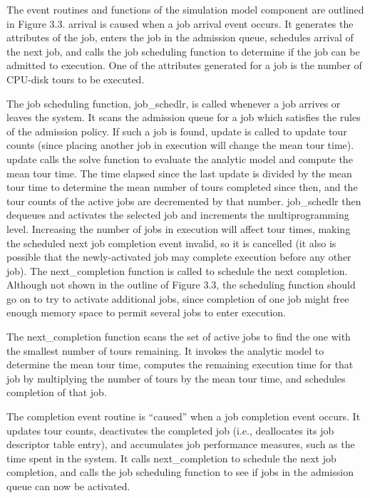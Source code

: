 The event routines and functions of the simulation model component are
outlined in Figure 3.3. arrival is caused when a job arrival event occurs. It
generates the attributes of the job, enters the job in the admission queue,
schedules arrival of the next job, and calls the job scheduling function to
determine if the job can be admitted to execution. One of the attributes
generated for a job is the number of CPU-disk tours to be executed.

The job scheduling function, job\_schedlr, is called whenever a job arrives or
leaves the system. It scans the admission queue for a job which satisfies the
rules of the admission policy. If such a job is found, update is called to
update tour counts (since placing another job in execution will change the mean
tour time). update calls the solve function to evaluate the analytic model and
compute the mean tour time. The time elapsed since the last update is divided
by the mean tour time to determine the mean number of tours completed since
then, and the tour counts of the active jobs are decremented by that number.
job\_schedlr then dequeues and activates the selected job and increments the
multiprogramming level. Increasing the number of jobs in execution will affect
tour times, making the scheduled next job completion event invalid, so it is
cancelled (it also is possible that the newly-activated job may complete
execution before any other job). The next\_completion function is called to
schedule the next completion. Although not shown in the outline of Figure 3.3,
the scheduling function should go on to try to activate additional jobs, since
completion of one job might free enough memory space to permit several jobs to
enter execution.

The next\_completion function scans the set of active jobs to find the one with
the smallest number of tours remaining. It invokes the analytic model to
determine the mean tour time, computes the remaining execution
\noindent time for that
job by multiplying the number of tours by the mean tour time, and schedules
completion of that job.

The completion event routine is ``caused'' when a job completion event occurs.
It updates tour counts, deactivates the completed job (i.e., deallocates its
job descriptor table entry), and accumulates job performance measures, such as
the time spent in the system. It calls next\_completion to schedule the next job
completion, and calls the job scheduling function to see if jobs in the
admission queue can now be activated.

